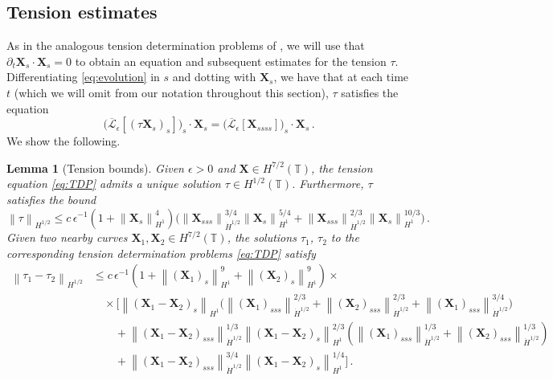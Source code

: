 \documentclass[11pt,reqno]{amsart}
\newcommand{\T}{\mathbb{T}}
\newcommand{\X}{\bm{X}}
\newcommand{\p}{\partial}
\newcommand{\norm}[1]{\left\lVert #1 \right\rVert}
\newcommand{\mc}[1]{\mathcal{#1}}
\numberwithin{equation}{section}
\newtheorem{lemma}[theorem]{Lemma}
\theoremstyle{definition}
\begin{document}
\subsection{Tension estimates}\label{subsec:tension}
As in the analogous tension determination problems of \cite{mori2023well,kuo2023tension,garcia2025immersed,albritton2025rods,ohm2025slender}, we will use that $\p_t\X_s\cdot\X_s=0$ to obtain an equation and subsequent estimates for the tension $\tau$. Differentiating \eqref{eq:evolution} in $s$ and dotting with $\X_s$, we have that at each time $t$ (which we will omit from our notation throughout this section), $\tau$ satisfies the equation 
\begin{equation}\label{eq:TDP}
\big(\overline{\mc{L}}_\epsilon[(\tau\X_s)_s]\big)_s\cdot\X_s = \big(\overline{\mc{L}}_\epsilon[\X_{ssss}]\big)_s\cdot\X_s\,.
\end{equation}
We show the following.
\begin{lemma}[Tension bounds]\label{lem:TDP}
  Given $\epsilon>0$ and $\X\in H^{7/2}(\T)$, the tension equation \eqref{eq:TDP} admits a unique solution $\tau\in H^{1/2}(\T)$. Furthermore, $\tau$ satisfies the bound 
\begin{equation}\label{eq:tau_bound}
  \norm{\tau}_{H^{1/2}}\le c\,\epsilon^{-1} (1+\norm{\X_s}_{H^1}^4)\big(\norm{\X_{sss}}_{\dot H^{1/2}}^{3/4}\norm{\X_s}_{H^1}^{5/4}+ \norm{\X_{sss}}_{\dot H^{1/2}}^{2/3}\norm{\X_s}_{H^1}^{10/3}\big)\,.
\end{equation}
%
%
Given two nearby curves $\X_1,\X_2\in H^{7/2}(\T)$, the solutions $\tau_1$, $\tau_2$ to the corresponding tension determination problems \eqref{eq:TDP} satisfy 
\begin{equation}\label{eq:tau_lip}
\begin{aligned}
  \norm{\tau_1-\tau_2}_{H^{1/2}} 
  &\le 
  c\,\epsilon^{-1}(1+\norm{(\X_1)_s}_{H^1}^9+\norm{(\X_2)_s}_{H^1}^9)\times\\
  &\quad \times \bigg[\norm{(\X_1-\X_2)_s}_{H^1}\bigg(\norm{(\X_1)_{sss}}_{\dot H^{1/2}}^{2/3} + \norm{(\X_2)_{sss}}_{\dot H^{1/2}}^{2/3} + \norm{(\X_1)_{sss}}_{\dot H^{1/2}}^{3/4}\bigg) \\
  &\qquad + \norm{(\X_1-\X_2)_{sss}}_{\dot H^{1/2}}^{1/3}\norm{(\X_1-\X_2)_s}_{H^1}^{2/3}(\norm{(\X_1)_{sss}}_{\dot H^{1/2}}^{1/3}+\norm{(\X_2)_{sss}}_{\dot H^{1/2}}^{1/3}) \\
  &\qquad  + \norm{(\X_1-\X_2)_{sss}}_{\dot H^{1/2}}^{3/4}\norm{(\X_1-\X_2)_s}_{H^1}^{1/4} \bigg] \,.
\end{aligned}
\end{equation}
\end{lemma}
\end{document}
